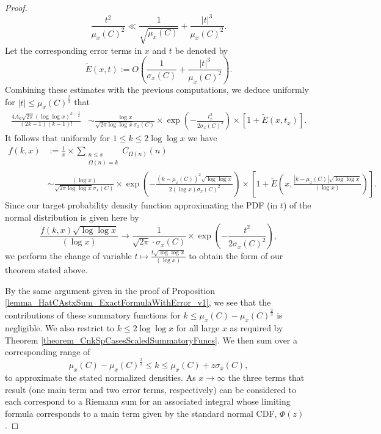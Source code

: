 \documentclass[11pt,reqno,a4letter]{article}
\numberwithin{figure}{section}
\numberwithin{table}{section}
\theoremstyle{plain}
\numberwithin{theorem}{section}
\theoremstyle{definition}
\begin{document}
\begin{proof}
\[
\frac{t^2}{\mu_x(C)^2} \ll \frac{1}{\sqrt{\mu_x(C)}} + 
     \frac{|t|^3}{\mu_x(C)^2}. 
\] 
Let the corresponding error terms in $x$ and $t$ be denoted by 
\[
\widetilde{E}(x, t) := O\left(\frac{1}{\sigma_x(C)} + \frac{|t|^3}{\mu_x(C)^2}\right). 
\]
Combining these estimates with the previous computations, we deduce 
uniformly for $|t| \leq \mu_x(C)^{\frac{2}{3}}$ that 
\begin{align*} 
\frac{4A_0\sqrt{2\pi} (\log\log x)^{k-\frac{1}{2}}}{(2k-1)(k-1)!} & \sim 
     \frac{\log x}{\sqrt{2\pi \log\log x} \sigma_x(C)} 
     \times \exp\left(-\frac{t_x^2}{2\sigma_x(C)^2}\right) \times 
     \left[1 + \widetilde{E}(x, t_x)\right]. 
\end{align*} 
It follows that uniformly for $1 \leq k \leq 2\log\log x$ we have 
\begin{align*}
f(k, x) & := 
     \frac{1}{x} \times \sum_{\substack{n \leq x \\ \Omega(n)=k}} C_{\Omega(n)}(n) \\ 
     & \sim 
     \frac{(\log x)}{\sqrt{2\pi \log\log x} \sigma_x(C)} 
     \times \exp\left(-\frac{(k-\mu_x(C))^2 \sqrt{\log\log x}}{2 (\log x) \sigma_x(C)^2}\right) \times 
     \left[1 + \widetilde{E}\left(x, \frac{|k - \mu_x(C)| \sqrt{\log\log x}}{(\log x)}\right)\right]. 
\end{align*}
Since our target probability density function approximating the PDF (in $t$) of the 
normal distribution is given here by 
$$\frac{f(k, x) \sqrt{\log\log x}}{(\log x)} 
  \rightarrow \frac{1}{\sqrt{2\pi} \cdot \sigma_x(C)} \times \exp\left(-\frac{t^2}{2
  \sigma_x(C)^2}\right),$$ 
we perform the change of variable $t \mapsto \frac{t \sqrt{\log\log x}}{(\log x)}$ to obtain the 
form of our theorem stated above. 

By the same argument given in the proof of 
Proposition \ref{lemma_HatCAstxSum_ExactFormulaWithError_v1}, we see that 
the contributions of these summatory functions for 
$k \leq \mu_x(C) - \mu_x(C)^{\frac{2}{3}}$ is negligible. 
We also restrict to $k \leq 2\log\log x$ for all large $x$ as required by 
Theorem \ref{theorem_CnkSpCasesScaledSummatoryFuncs}. We then sum over a 
corresponding range of 
\[
\mu_x(C) -\mu_x(C)^{\frac{2}{3}} \leq k \leq \mu_x(C) + z \sigma_x(C), 
\] 
to approximate the stated normalized densities. 
As $x \rightarrow \infty$ the 
three terms that result (one main term and two error terms, respectively) 
can be considered to each correspond to a Riemann sum for an associated integral whose 
limiting formula corresponds to a main term given by the standard normal CDF, $\Phi(z)$. 
\end{proof} 
\end{document}
